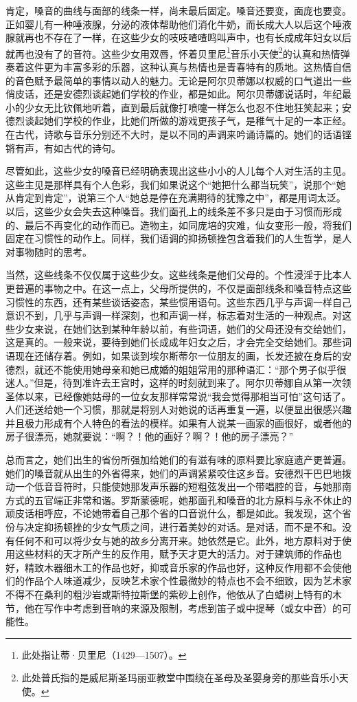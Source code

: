 \par 肯定，嗓音的曲线与面部的线条一样，尚未最后固定。嗓音还要变，面庞也要变。正如婴儿有一种唾液腺，分泌的液体帮助他们消化牛奶，而长成大人以后这个唾液腺就再也不存在了一样，在这些少女的吱吱喳喳鸣叫声中，也有长成成年妇女以后就再也没有了的音符。这些少女用双唇，怀着贝里尼\footnote{此处指让蒂·贝里尼（1429—1507）。}音乐小天使\footnote{此处普氏指的是威尼斯圣玛丽亚教堂中围绕在圣母及圣婴身旁的那些音乐小天使。}的认真和热情弹奏着这件更为丰富多彩的乐器，这种认真与热情也是青春特有的质地。这热情自信的音色赋予最简单的事情以动人的魅力。无论是阿尔贝蒂娜以权威的口气道出一些俏皮话，还是安德烈谈起她们学校的作业，都是如此。阿尔贝蒂娜说话时，年纪最小的少女无比钦佩地听着，直到最后就像打喷嚏一样怎么也忍不住地狂笑起来；安德烈谈起她们学校的作业，比她们所做的游戏更孩子气，是稚气十足的一本正经。在古代，诗歌与音乐分别还不大时，是以不同的声调来吟诵诗篇的。她们的话语铿锵有声，有如古代的诗句。
\par 尽管如此，这些少女的嗓音已经明确表现出这些小小的人儿每个人对生活的主见。这些主见是那样具有个人色彩，我们如果说这个“她把什么都当玩笑”，说那个“她从肯定到肯定”，说第三个人“她总是停在充满期待的犹豫之中”，都是用词太泛。以后，这些少女会失去这种嗓音。我们面孔上的线条差不多只是由于习惯而形成的、最后不再变化的动作而已。造物主，如同庞培的灾难，仙女变形一般，将我们固定在习惯性的动作上。同样，我们语调的抑扬顿挫包含着我们的人生哲学，是人对事物随时的思考。
\par 当然，这些线条不仅仅属于这些少女。这些线条是他们父母的。个性浸淫于比本人更普遍的事物之中。在这一点上，父母所提供的，不仅是面部线条和嗓音特点这些习惯性的东西，还有某些谈话姿态，某些惯用语句。这些东西几乎与声调一样自己意识不到，几乎与声调一样深刻，也和声调一样，标志着对生活的一种观点。对这些少女来说，在她们达到某种年龄以前，有些词语，她们的父母还没有交给她们，这是真的。一般来说，要待到她们长成成年妇女之后，才会完全交给她们。那些词语现在还储存着。例如，如果谈到埃尔斯蒂尔一位朋友的画，长发还披在身后的安德烈，就还不能使用她母亲和她已成婚的姐姐常用的那种语汇：“那个男子似乎很迷人。”但是，待到准许去王宫时，这样的时刻就到来了。阿尔贝蒂娜自从第一次领圣体以来，已经像她姑母的一位女友那样常常说“我会觉得那相当可怕”这句话了。人们还送给她一个习惯，那就是将别人对她说的话再重复一遍，以便显出很感兴趣并且极力形成有个人特色的看法的模样。如果有人说某一画家的画很好，或者他的房子很漂亮，她就要说：“啊？！他的画好？啊？！他的房子漂亮？”
\par 总而言之，她们出生的省份所强加给她们的有滋有味的原料要比家庭遗产更普遍。她们的嗓音就从出生的外省得来，她们的声调紧紧咬住这乡音。安德烈干巴巴地拨动一个低音音符时，只能使她那发声乐器的短粗弦发出一个带唱腔的音，与她那南方式的五官端正非常和谐。罗斯蒙德呢，她那面孔和嗓音的北方原料与永不休止的顽皮话相呼应，不论她带着自己那个省的口音说什么，都是如此。我发现，这个省份与决定抑扬顿挫的少女气质之间，进行着美妙的对话。是对话，而不是不和。没有任何不和可以将少女与她的故乡分离开来。她依然是它。此外，地方原料对于使用这些材料的天才所产生的反作用，赋予天才更大的活力。对于建筑师的作品也好，精致木器细木工的作品也好，抑或音乐家的作品也好，这种反作用都不会使他们的作品个人味道减少，反映艺术家个性最微妙的特点也不会不细致，因为艺术家不得不在桑利的粗沙岩或斯特拉斯堡的紫砂上创作，他依从了白蜡树上特有的木节，他在写作中考虑到音响的来源及限制，考虑到笛子或中提琴（或女中音）的可能性。

